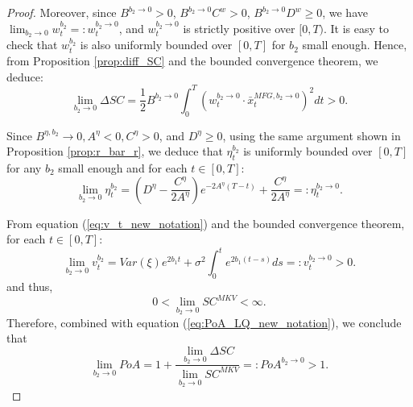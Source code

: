 \documentclass[11pt]{article}
\begin{document}
\begin{proof}
	
	Moreover, since $B^{b_2 \to 0}>0$, $B^{b_2 \to 0}C^w >0$, $B^{b_2\to 0}D^w \geq 0$, we have $\lim_{b_2 \to 0} w_t^{b_2}=:w_t^{b_2 \to 0}$, and $w_t^{b_2 \to 0}$ is strictly positive over $[0,T)$. It is easy to check that $w_t^{b_2}$ is also uniformly bounded over $[0,T]$ for $b_2$ small enough. Hence, from Proposition \ref{prop:diff_SC} and the bounded convergence theorem, we deduce:
	\begin{equation*}
	\lim_{b_2 \to 0} \Delta SC = \frac{1}{2} B^{b_2\to 0} \int_0^T (w_t^{b_2 \to 0} \cdot \bar{x}_t^{MFG,b_2 \to 0})^2 dt >0.
	\end{equation*}
	
	
	Since $B^{\eta,b_2} \to 0, A^{\eta} < 0, C^{\eta} >0$, and $D^{\eta} \geq 0$, using the same argument shown in Proposition \ref{prop:r_bar_r}, 
	we deduce that $\eta_t^{b_2}$ is uniformly bounded over $[0,T]$ for any $b_2$ small enough and for each $t \in[0,T]$:
	$$\lim_{b_2 \to 0}\eta_t^{b_2}=\left(D^{\eta} - \frac{C^{\eta}}{2A^\eta}\right) e^{-2A^\eta(T-t)} + \frac{C^\eta}{2A^{\eta} }=:\eta_t^{b_2 \to 0}.$$
	
	From equation (\ref{eq:v_t_new_notation}) and the bounded convergence theorem, for each $t \in [0,T]$:
	$$ \lim_{b_2 \to 0}v_t^{b_2}=Var(\xi) e^{2b_1 t} + \sigma^2 \int_0^t e^{2b_1 (t-s)} ds=:v_t^{b_2 \to 0}>0.$$
	and thus,
	$$ 0 < \lim_{b_2 \to 0} SC^{MKV} < \infty.$$
	Therefore, combined with equation (\ref{eq:PoA_LQ_new_notation}), we conclude that $$\lim_{b_2 \to 0} PoA = 1 + \frac{\displaystyle \lim_{b_2 \to 0}\Delta SC}{\displaystyle \lim_{b_2 \to 0} SC^{MKV} } =: PoA^{b_2 \to 0} > 1.$$
	
\end{proof}
\end{document}
